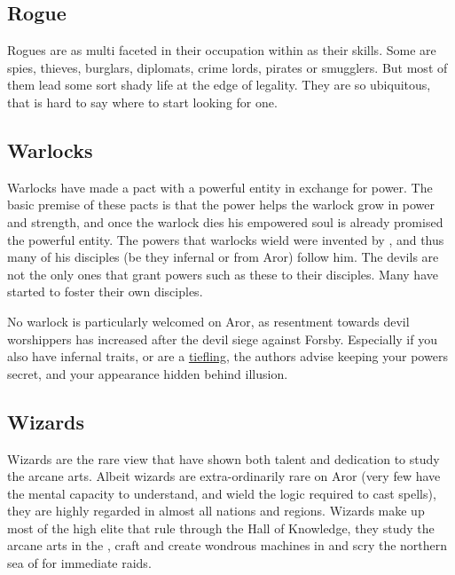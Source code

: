 
\subsection{Rogue}
\label{sec:Rogue}

Rogues are as multi faceted in their occupation within as their skills. Some
are spies, thieves, burglars, diplomats, crime lords, pirates or smugglers.
But most of them lead some sort shady life at the edge of legality. They are
so ubiquitous, that is hard to say where to start looking for one.


\subsection{Warlocks}
\label{sec:Warlocks}

Warlocks have made a pact with a powerful entity in exchange for power. The
basic premise of these pacts is that the power helps the warlock grow in
power and strength, and once the warlock dies his empowered soul is already
promised the powerful entity. The powers that warlocks wield were invented
by , and thus many of his disciples (be they infernal
or from Aror) follow him. The devils are not the only ones that grant powers
such as these to their disciples. Many  have started
to foster their own disciples.

No warlock is particularly welcomed on Aror, as resentment towards devil
worshippers has increased after the devil siege against Forsby. Especially if
you also have infernal traits, or are a \hyperref[sec:Tieflings]{tiefling},
the authors advise keeping your powers secret, and your appearance hidden
behind illusion.

\subsection{Wizards}
\label{sec:Wizards}

Wizards are the rare view that have shown both talent and dedication to study
the arcane arts. Albeit wizards are extra-ordinarily rare on Aror (very few
have the mental capacity to understand, and wield the logic required to cast
spells), they are highly regarded in almost all nations and regions. Wizards
make up most of the high elite that rule  through
the Hall of Knowledge, they study the arcane arts in the , craft and create wondrous machines in  and
scry the northern sea of  for immediate raids.

